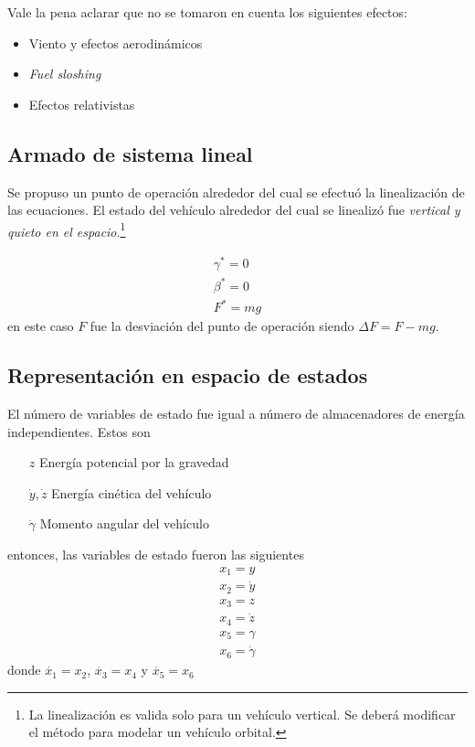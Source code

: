 Vale la pena aclarar que no se tomaron en cuenta los siguientes efectos:
\begin{itemize}
	\item Viento y efectos aerodinámicos
	\item \textit{Fuel sloshing}
	\item Efectos relativistas
\end{itemize}

\subsection{Armado de sistema lineal}

Se propuso un punto de operación alrededor del cual se efectuó la linealización de las ecuaciones. El estado del vehículo alrededor del cual se linealizó fue \textit{vertical y quieto en el espacio}.\footnote{La linealización es valida solo para un vehículo vertical. Se deberá modificar el método para modelar un vehículo orbital.} 

\begin{align*}
	\gamma^* = 0 \\
	\beta^* = 0 \\
	F^* = mg
\end{align*}
en este caso $F$ fue la desviación del punto de operación siendo $\Delta F = F- mg$.

\subsection{Representación en espacio de estados}
El número de variables de estado fue igual a número de almacenadores de energía independientes. Estos son

\begin{enumerate}
	\item[$z$] Energía potencial por la gravedad
	\item[$\dot{y},\dot{z}$] Energía cinética del vehículo
	\item[$\dot{\gamma}$] Momento angular del vehículo
\end{enumerate}
entonces, las variables de estado fueron las siguientes
\begin{align*}
	x_1 = y \\
	x_2 = \dot{y} \\
	x_3 = z \\
	x_4 = \dot{z} \\
	x_5 = \gamma \\
	x_6 = \dot{\gamma}
\end{align*}
donde $\dot{x_1} = x_2$, $\dot{x_3} = x_4$ y $\dot{x_5} = x_6$

